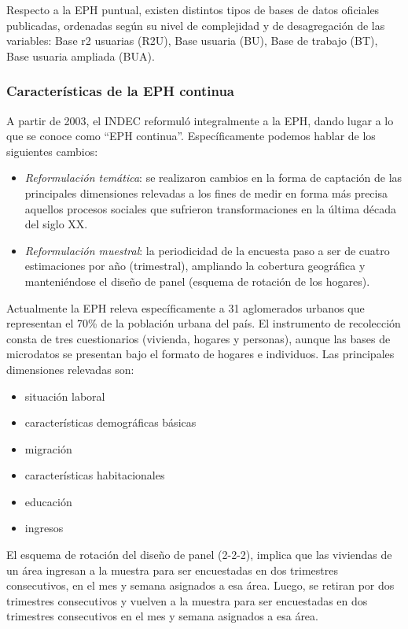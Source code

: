 \documentclass[
]{article}
\providecommand{\tightlist}{%
  \setlength{\itemsep}{0pt}\setlength{\parskip}{0pt}}
\begin{document}
Respecto a la EPH puntual, existen distintos tipos de bases de datos oficiales publicadas, ordenadas según su nivel de complejidad y de desagregación de las variables: Base r2 usuarias (R2U), Base usuaria (BU), Base de trabajo (BT), Base usuaria ampliada (BUA).

\hypertarget{caracteruxedsticas-de-la-eph-continua}{%
\subsubsection{Características de la EPH continua}\label{caracteruxedsticas-de-la-eph-continua}}

A partir de 2003, el INDEC reformuló integralmente a la EPH, dando lugar a lo que se conoce como ``EPH continua''. Específicamente podemos hablar de los siguientes cambios:

\begin{itemize}
\item
  \emph{Reformulación temática}: se realizaron cambios en la forma de captación de las principales dimensiones relevadas a los fines de medir en forma más precisa aquellos procesos sociales que sufrieron transformaciones en la última década del siglo XX.
\item
  \emph{Reformulación muestral}: la periodicidad de la encuesta paso a ser de cuatro estimaciones por año (trimestral), ampliando la cobertura geográfica y manteniéndose el diseño de panel (esquema de rotación de los hogares).
\end{itemize}

Actualmente la EPH releva específicamente a 31 aglomerados urbanos que representan el 70\% de la población urbana del país. El instrumento de recolección consta de tres cuestionarios (vivienda, hogares y personas), aunque las bases de microdatos se presentan bajo el formato de hogares e individuos. Las principales dimensiones relevadas son:

\begin{itemize}
\tightlist
\item
  situación laboral
\item
  características demográficas básicas
\item
  migración
\item
  características habitacionales
\item
  educación
\item
  ingresos
\end{itemize}

El esquema de rotación del diseño de panel (2-2-2), implica que las viviendas de un área ingresan a la muestra para ser encuestadas en dos trimestres consecutivos, en el mes y semana asignados a esa área. Luego, se retiran por dos trimestres consecutivos y vuelven a la muestra para ser encuestadas en dos trimestres consecutivos en el mes y semana asignados a esa área.
\end{document}
